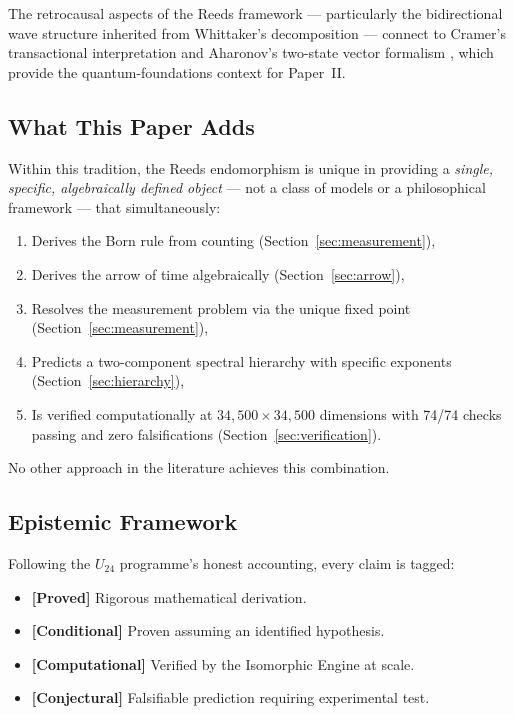 \documentclass[12pt,a4paper]{article}
\newcommand{\proved}[1]{\textcolor{proved}{\textbf{[Proved]}} #1}
\newcommand{\conditional}[1]{\textcolor{conditional}{\textbf{[Conditional]}} #1}
\newcommand{\computational}[1]{\textcolor{computational}{\textbf{[Computational]}} #1}
\newcommand{\conjectural}[1]{\textcolor{conjectural}{\textbf{[Conjectural]}} #1}
\theoremstyle{definition}
\theoremstyle{remark}
\begin{document}
The retrocausal aspects of the Reeds framework --- particularly the bidirectional
wave structure inherited from Whittaker's decomposition --- connect to Cramer's
transactional interpretation \cite{cramer1986} and Aharonov's two-state vector
formalism \cite{aharonov1964}, which provide the quantum-foundations context for
Paper~II.

\subsection{What This Paper Adds}

Within this tradition, the Reeds endomorphism is unique in providing a
\emph{single, specific, algebraically defined object} --- not a class of models
or a philosophical framework --- that simultaneously:
\begin{enumerate}
  \item Derives the Born rule from counting (Section~\ref{sec:measurement}),
  \item Derives the arrow of time algebraically (Section~\ref{sec:arrow}),
  \item Resolves the measurement problem via the unique fixed point
  (Section~\ref{sec:measurement}),
  \item Predicts a two-component spectral hierarchy with specific exponents
  (Section~\ref{sec:hierarchy}),
  \item Is verified computationally at $34{,}500 \times 34{,}500$ dimensions
  with 74/74 checks passing and zero falsifications
  (Section~\ref{sec:verification}).
\end{enumerate}
No other approach in the literature achieves this combination.

\subsection{Epistemic Framework}

Following the $U_{24}$ programme's honest accounting, every claim is tagged:
\begin{itemize}
  \item \proved{Rigorous mathematical derivation.}
  \item \conditional{Proven assuming an identified hypothesis.}
  \item \computational{Verified by the Isomorphic Engine at scale.}
  \item \conjectural{Falsifiable prediction requiring experimental test.}
\end{itemize}
\end{document}
